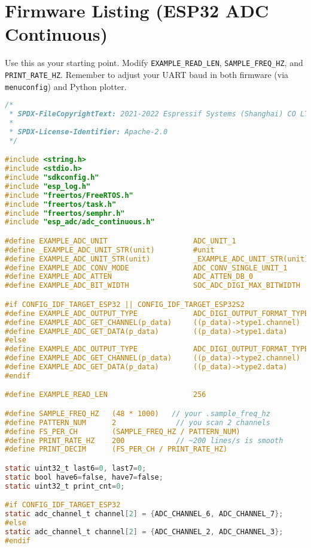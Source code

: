 \documentclass[11pt]{article}
\begin{document}
\section*{Firmware Listing (ESP32 ADC Continuous)}
Use this as your starting point. Modify \texttt{EXAMPLE\_READ\_LEN}, \texttt{SAMPLE\_FREQ\_HZ}, and \texttt{PRINT\_RATE\_HZ}. Remember to adjust your UART baud in both firmware (via \texttt{menuconfig}) and Python plotter.
\begin{lstlisting}[language=C, caption={ESP32 Firmware (ADC continuous, two channels)}]
/*
 * SPDX-FileCopyrightText: 2021-2022 Espressif Systems (Shanghai) CO LTD
 *
 * SPDX-License-Identifier: Apache-2.0
 */

#include <string.h>
#include <stdio.h>
#include "sdkconfig.h"
#include "esp_log.h"
#include "freertos/FreeRTOS.h"
#include "freertos/task.h"
#include "freertos/semphr.h"
#include "esp_adc/adc_continuous.h"

#define EXAMPLE_ADC_UNIT                    ADC_UNIT_1
#define _EXAMPLE_ADC_UNIT_STR(unit)         #unit
#define EXAMPLE_ADC_UNIT_STR(unit)          _EXAMPLE_ADC_UNIT_STR(unit)
#define EXAMPLE_ADC_CONV_MODE               ADC_CONV_SINGLE_UNIT_1
#define EXAMPLE_ADC_ATTEN                   ADC_ATTEN_DB_0
#define EXAMPLE_ADC_BIT_WIDTH               SOC_ADC_DIGI_MAX_BITWIDTH

#if CONFIG_IDF_TARGET_ESP32 || CONFIG_IDF_TARGET_ESP32S2
#define EXAMPLE_ADC_OUTPUT_TYPE             ADC_DIGI_OUTPUT_FORMAT_TYPE1
#define EXAMPLE_ADC_GET_CHANNEL(p_data)     ((p_data)->type1.channel)
#define EXAMPLE_ADC_GET_DATA(p_data)        ((p_data)->type1.data)
#else
#define EXAMPLE_ADC_OUTPUT_TYPE             ADC_DIGI_OUTPUT_FORMAT_TYPE2
#define EXAMPLE_ADC_GET_CHANNEL(p_data)     ((p_data)->type2.channel)
#define EXAMPLE_ADC_GET_DATA(p_data)        ((p_data)->type2.data)
#endif

#define EXAMPLE_READ_LEN                    256

#define SAMPLE_FREQ_HZ   (48 * 1000)   // your .sample_freq_hz
#define PATTERN_NUM      2              // you scan 2 channels
#define FS_PER_CH        (SAMPLE_FREQ_HZ / PATTERN_NUM)
#define PRINT_RATE_HZ    200            // ~200 lines/s is smooth
#define PRINT_DECIM      (FS_PER_CH / PRINT_RATE_HZ)

static uint32_t last6=0, last7=0;
static bool have6=false, have7=false;
static uint32_t print_cnt=0;

#if CONFIG_IDF_TARGET_ESP32
static adc_channel_t channel[2] = {ADC_CHANNEL_6, ADC_CHANNEL_7};
#else
static adc_channel_t channel[2] = {ADC_CHANNEL_2, ADC_CHANNEL_3};
#endif


\end{lstlisting}
\end{document}
